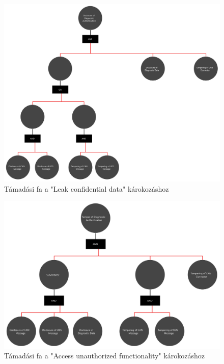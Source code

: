 \begin{figure}[!ht]
	\centering
	\includegraphics[width=120mm, keepaspectratio]{figures/AT-SECDIAG-00.png}
	\caption{Támadási fa a "Leak confidential data" károkozáshoz} 
	\label{fig:ff_leak_data}
\end{figure}
\begin{figure}[!ht]
	\centering
	\includegraphics[width=120mm, keepaspectratio]{figures/AT-SECDIAG-01.png}
	\caption{Támadási fa a "Access unauthorized functionality" károkozáshoz} 
	\label{fig:ff_access}
\end{figure}
